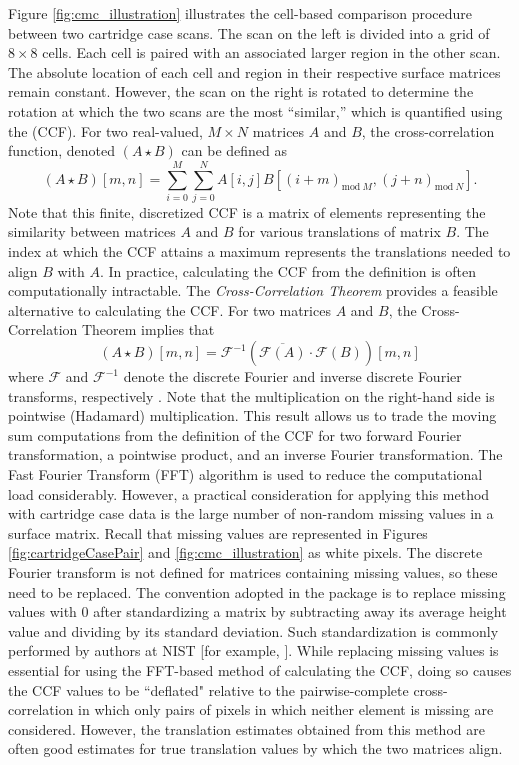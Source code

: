 Figure \ref{fig:cmc_illustration} illustrates the cell-based comparison
procedure between two cartridge case scans. The scan on the left is
divided into a grid of \(8 \times 8\) cells. Each cell is paired with an
associated larger region in the other scan. The absolute location of
each cell and region in their respective surface matrices remain
constant. However, the scan on the right is rotated to determine the
rotation at which the two scans are the most ``similar,'' which is
quantified using the  (CCF). For two
real-valued, \(M \times N\) matrices \(A\) and \(B\), the
cross-correlation function, denoted \((A \star B)\) can be defined as \[
(A \star B)[m,n] = \sum_{i=0}^M \sum_{j=0}^N A[i,j] B[(i + m)_{\text{mod}\ M}, (j + n)_{\text{mod}\ N}].
\] Note that this finite, discretized CCF is a matrix of elements
representing the similarity between matrices \(A\) and \(B\) for various
translations of matrix \(B\). The index at which the CCF attains a
maximum represents the translations needed to align \(B\) with \(A\). In
practice, calculating the CCF from the definition is often
computationally intractable. The \emph{Cross-Correlation Theorem}
provides a feasible alternative to calculating the CCF. For two matrices
\(A\) and \(B\), the Cross-Correlation Theorem implies that \[
(A \star B )[m,n]= \mathcal{F}^{-1}\left(\overline{\mathcal{F}(A)} \cdot \mathcal{F}(B)\right)[m,n]
\] where \(\mathcal{F}\) and \(\mathcal{F}^{-1}\) denote the discrete
Fourier and inverse discrete Fourier transforms, respectively
\citep{fft_brigham}. Note that the multiplication on the right-hand side
is pointwise (Hadamard) multiplication. This result allows us to trade
the moving sum computations from the definition of the CCF for two
forward Fourier transformation, a pointwise product, and an inverse
Fourier transformation. The Fast Fourier Transform (FFT) algorithm is
used to reduce the computational load considerably. However, a practical
consideration for applying this method with cartridge case data is the
large number of non-random missing values in a surface matrix. Recall
that missing values are represented in Figures
\ref{fig:cartridgeCasePair} and \ref{fig:cmc_illustration} as white
pixels. The discrete Fourier transform is not defined for matrices
containing missing values, so these need to be replaced. The convention
adopted in the  package is to replace missing values with 0
after standardizing a matrix by subtracting away its average height
value and dividing by its standard deviation. Such standardization is
commonly performed by authors at NIST {[}for example,
\citep{ott_applying_2017}{]}. While replacing missing values is
essential for using the FFT-based method of calculating the CCF, doing
so causes the CCF values to be ``deflated" relative to the
pairwise-complete cross-correlation in which only pairs of pixels in
which neither element is missing are considered. However, the
translation estimates obtained from this method are often good estimates
for true translation values by which the two matrices align.

